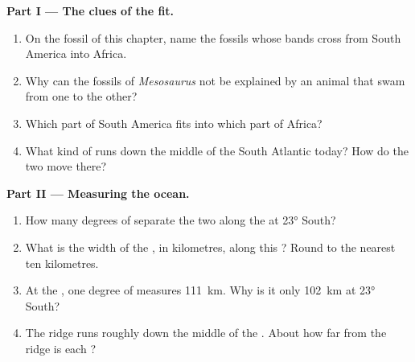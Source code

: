 \begin{problem}
\medskip
\noindent\textbf{Part I --- The clues of the fit.}
\begin{enumerate}
  \item On the fossil  of this chapter, name the fossils whose bands
        cross from South America into Africa.
  \item Why can the fossils of \emph{Mesosaurus} not be explained by an
        animal that swam from one  to the other?
  \item Which part of South America fits into which part of Africa?
  \item What kind of  runs down the middle of the South
        Atlantic today? How do the two  move there?
\end{enumerate}

\medskip
\noindent\textbf{Part II --- Measuring the ocean.}
\begin{enumerate}[resume]
  \item How many degrees of  separate the two  along the
         at \ang{23} South?
  \item What is the width of the , in kilometres, along this
        ? Round to the nearest ten kilometres.
  \item At the , one degree of  measures \qty{111}{km}.
        Why is it only \qty{102}{km} at \ang{23} South?
  \item The ridge runs roughly down the middle of the . About how far
        from the ridge is each ?
\end{enumerate}


\end{problem}
